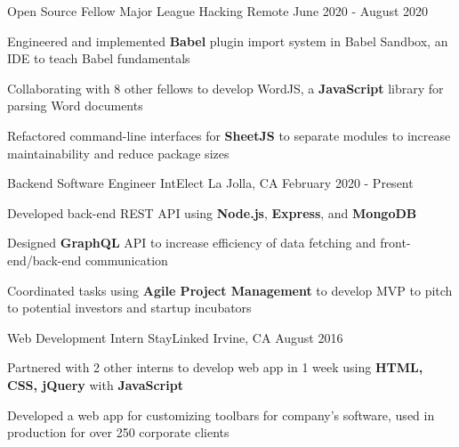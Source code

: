 \documentclass[]{awesome-cv}
\begin{document}
\vspace{-3mm}
\begin{cventries}
  \vspace{-1mm}
	\cventry
  {Open Source Fellow}
	{Major League Hacking}
  {Remote}
	{June 2020 - August 2020}
	{\begin{cvitems}
    \item {Engineered and implemented \textbf{Babel} plugin import system in Babel Sandbox, an
      IDE to teach Babel fundamentals}
    \item {Collaborating with 8 other fellows to develop WordJS, a \textbf{JavaScript} library
    for parsing Word documents}
    \item {Refactored command-line interfaces for \textbf{SheetJS}
      to separate modules to increase
      maintainability and reduce package sizes}
		\end{cvitems}}

	\vspace{-3mm}
	\cventry
  {Backend Software Engineer}
	{IntElect}
	{La Jolla, CA}
	{February 2020 - Present}
	{\begin{cvitems}
    \item {Developed back-end REST API
      using \textbf{Node.js}, \textbf{Express}, and \textbf{MongoDB}}
    \item {Designed \textbf{GraphQL} API to increase efficiency of data fetching
      and front-end/back-end communication}
    \item {Coordinated tasks using \textbf{Agile
      Project Management} to develop MVP to pitch to potential investors and
      startup incubators}
		\end{cvitems}}

	\vspace{-3mm}
	\cventry
	{Web Development Intern}
	{StayLinked}
	{Irvine, CA}
	{August 2016}
	{\begin{cvitems}
    \item {Partnered with 2 other interns to develop web app in 1 week using
      \textbf{HTML, CSS, jQuery} with \textbf{JavaScript}}
		\item {Developed a web app for customizing toolbars for company’s software,
      used in production for over 250 corporate clients}
		\end{cvitems}}
\end{cventries}
\end{document}

